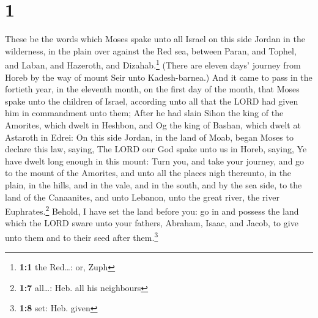 \hypertarget{section}{%
\section{1}\label{section}}

 These be the words which Moses spake unto all Israel on
this side Jordan in the wilderness, in the plain over against the Red
sea, between Paran, and Tophel, and Laban, and Hazeroth, and
Dizahab.\footnote{\textbf{1:1} the Red\ldots: or, Zuph} 
(There are eleven days' journey from Horeb by the way of mount Seir unto
Kadesh-barnea.)  And it came to pass in the fortieth year,
in the eleventh month, on the first day of the month, that Moses spake
unto the children of Israel, according unto all that the LORD had given
him in commandment unto them;  After he had slain Sihon
the king of the Amorites, which dwelt in Heshbon, and Og the king of
Bashan, which dwelt at Astaroth in Edrei:  On this side
Jordan, in the land of Moab, began Moses to declare this law, saying,
 The LORD our God spake unto us in Horeb, saying, Ye have
dwelt long enough in this mount:  Turn you, and take your
journey, and go to the mount of the Amorites, and unto all the places
nigh thereunto, in the plain, in the hills, and in the vale, and in the
south, and by the sea side, to the land of the Canaanites, and unto
Lebanon, unto the great river, the river Euphrates.\footnote{\textbf{1:7}
  all\ldots: Heb. all his neighbours}  Behold, I have set
the land before you: go in and possess the land which the LORD sware
unto your fathers, Abraham, Isaac, and Jacob, to give unto them and to
their seed after them.\footnote{\textbf{1:8} set: Heb. given}

